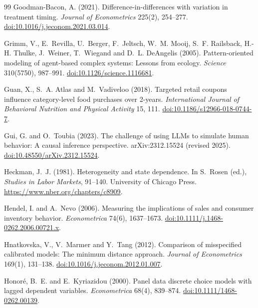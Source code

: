 \documentclass[11pt]{article}
\begin{document}
\begin{thebibliography}{99}
Goodman-Bacon, A. (2021).
Difference-in-differences with variation in treatment timing.
\emph{Journal of Econometrics} 225(2), 254--277.
\href{https://doi.org/10.1016/j.jeconom.2021.03.014}{doi:10.1016/j.jeconom.2021.03.014}.

Grimm, V., E.~Revilla, U.~Berger, F.~Jeltsch, W.~M. Mooij, S.~F. Railsback, H.-H. Thulke,
J.~Weiner, T.~Wiegand and D.~L. DeAngelis (2005).
Pattern-oriented modeling of agent-based complex systems: Lessons from ecology.
\emph{Science} 310(5750), 987--991.
\href{https://doi.org/10.1126/science.1116681}{doi:10.1126/science.1116681}.

Guan, X., S.~A. Atlas and M.~Vadiveloo (2018).
Targeted retail coupons influence category-level food purchases over 2-years.
\emph{International Journal of Behavioral Nutrition and Physical Activity} 15, 111.
\href{https://doi.org/10.1186/s12966-018-0744-7}{doi:10.1186/s12966-018-0744-7}.

Gui, G. and O.~Toubia (2023).
The challenge of using {LLM}s to simulate human behavior: A causal inference perspective.
arXiv:2312.15524 (revised 2025).
\href{https://doi.org/10.48550/arXiv.2312.15524}{doi:10.48550/arXiv.2312.15524}.

Heckman, J.~J. (1981).
Heterogeneity and state dependence.
In S.~Rosen (ed.), \emph{Studies in Labor Markets}, 91--140. University of Chicago Press.
\url{https://www.nber.org/chapters/c8909}.

Hendel, I. and A.~Nevo (2006).
Measuring the implications of sales and consumer inventory behavior.
\emph{Econometrica} 74(6), 1637--1673.
\href{https://doi.org/10.1111/j.1468-0262.2006.00721.x}{doi:10.1111/j.1468-0262.2006.00721.x}.

Hnatkovska, V., V.~Marmer and Y.~Tang (2012).
Comparison of misspecified calibrated models: The minimum distance approach.
\emph{Journal of Econometrics} 169(1), 131--138.
\href{https://doi.org/10.1016/j.jeconom.2012.01.007}{doi:10.1016/j.jeconom.2012.01.007}.

Honor{\'e}, B.~E. and E.~Kyriazidou (2000).
Panel data discrete choice models with lagged dependent variables.
\emph{Econometrica} 68(4), 839--874.
\href{https://doi.org/10.1111/1468-0262.00139}{doi:10.1111/1468-0262.00139}.


\end{thebibliography}
\end{document}
